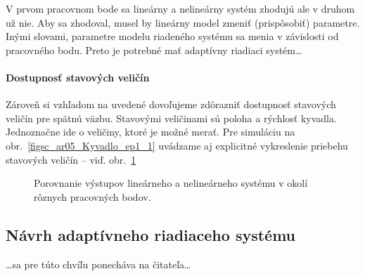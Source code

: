 \documentclass[a4paper, 10pt, ]{article}
\begin{document}
V prvom pracovnom bode sa lineárny a nelineárny systém zhodujú ale v druhom už nie. Aby sa zhodoval, musel by lineárny model zmeniť (prispôsobiť) parametre.  Inými slovami, parametre modelu riadeného systému sa menia v závislosti od pracovného bodu. Preto je potrebné mať adaptívny riadiaci systém\ldots






\paragraph{Dostupnosť stavových veličín}

Zároveň si vzhľadom na uvedené dovoľujeme zdôrazniť dostupnosť stavových veličín pre spätnú väzbu. Stavovými veličinami sú poloha a rýchlosť kyvadla. Jednoznačne ide o veličiny, ktoré je možné merať. Pre simuláciu na obr.~\ref{figsc_ar05_Kyvadlo_ep1_1} uvádzame aj explicitné vykreslenie priebehu stavových veličín -- viď. obr.~\ref{figsc_ar05_Kyvadlo_ep1_ss_1}






\begin{figure}[!b]
	\centering

    \vspace{-3mm}


    \vspace{-2mm}

	\caption{Porovnanie výstupov lineárneho a nelineárneho systému v okolí rôznych pracovných bodov.}
	\label{figsc_ar05_Kyvadlo_ep1_ss_1}

    \vspace{-2mm}

\end{figure}






\subsection{Návrh adaptívneho riadiaceho systému}

\ldots sa pre túto chvíľu ponecháva na čitateľa\ldots
\end{document}
